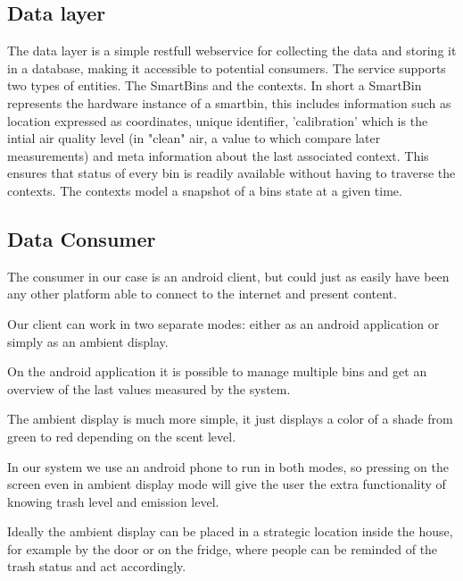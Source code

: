\subsection{Data layer}
The data layer is a simple restfull webservice for collecting the data and storing it in a database, making it accessible to potential consumers.
The service supports two types of entities. The SmartBins and the contexts.
In short a SmartBin represents the hardware instance of a smartbin, this includes information such as location expressed as coordinates, unique identifier, 'calibration' which is the intial air quality level (in "clean" air, a value to which compare later measurements) and meta information about the last associated context.
This ensures that status of every bin is readily available without having to traverse the contexts.
The contexts model a snapshot of a bins state at a given time.

\subsection{Data Consumer}
The consumer in our case is an android client, but could just as easily have been any other platform able to connect to the internet and present content.

Our client can work in two separate modes: either as an android application or simply as an ambient display.

On the android application it is possible to manage multiple bins and get an overview of the last values measured by the system.

The ambient display is much more simple, it just displays a color of a shade from green to red depending on the scent level. 

In our system we use an android phone to run in both modes, so pressing on the screen even in ambient display mode will give the user the extra functionality of knowing trash level and emission level.

Ideally the ambient display can be placed in a strategic location inside the house, for example by the door or on the fridge, where people can be reminded of the trash status and act accordingly.